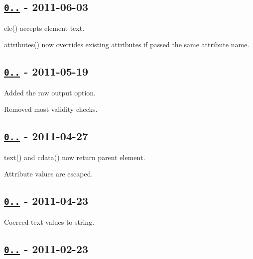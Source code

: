 \subsection*{\href{https://github.com/oozcitak/xmlbuilder-js/compare/v0.1.1...v0.1.2}{\tt 0..} -\/ 2011-\/06-\/03}


\begin{DoxyItemize}
\item {\ttfamily ele()} accepts element text.
\item {\ttfamily attributes()} now overrides existing attributes if passed the same attribute name.
\end{DoxyItemize}

\subsection*{\href{https://github.com/oozcitak/xmlbuilder-js/compare/v0.1.0...v0.1.1}{\tt 0..} -\/ 2011-\/05-\/19}


\begin{DoxyItemize}
\item Added the raw output option.
\item Removed most validity checks.
\end{DoxyItemize}

\subsection*{\href{https://github.com/oozcitak/xmlbuilder-js/compare/v0.0.7...v0.1.0}{\tt 0..} -\/ 2011-\/04-\/27}


\begin{DoxyItemize}
\item {\ttfamily text()} and {\ttfamily cdata()} now return parent element.
\item Attribute values are escaped.
\end{DoxyItemize}

\subsection*{\href{https://github.com/oozcitak/xmlbuilder-js/compare/v0.0.6...v0.0.7}{\tt 0..} -\/ 2011-\/04-\/23}


\begin{DoxyItemize}
\item Coerced text values to string.
\end{DoxyItemize}

\subsection*{\href{https://github.com/oozcitak/xmlbuilder-js/compare/v0.0.5...v0.0.6}{\tt 0..} -\/ 2011-\/02-\/23}


